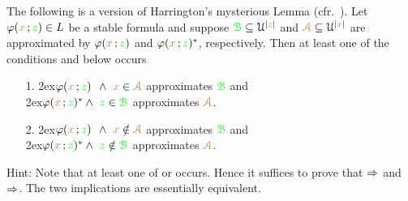 \documentclass[creche.tex]{subfiles}
\begin{document}
\begin{exercise}\label{ex_harrington}
\def\grB{{\gr{\EuScript B}}}
\def\mrA{{\mr{\EuScript A}}}
The following is a version of Harrington's mysterious 
Lemma (cfr.~\cite[Lemma 8.3.4]{TZ}).
Let $\varphi({\color{brown} x}\,;{\color{green} z})\in L$ be a stable formula and suppose $\grB\subseteq\U^{|{\gr z}|}$ and $\mrA\subseteq\U^{|{\mr x}|}$ are approximated by $\varphi({\color{brown} x}\,;{\color{green} z})$ and  $\varphi({\color{brown} x}\,;{\color{green} z})^*$, respectively.
Then at least one of the conditions  and  below occurs

\begin{itemize}
\item[1.]
\kern2ex$\phi({\mr x}\,;{\gr z})^{\phantom{*}}\wedge\ {\mr x}\in{\mrA}$ approximates $\grB$ and\\
\kern2ex$\phi({\mr x}\,;{\gr z})^*\wedge\ {\gr z}\in{\grB}$ approximates $\mrA$.

\item[2.]
\kern2ex$\phi({\mr x}\,;{\gr z})^{\phantom{*}}\wedge\ {\mr x}\notin{\mrA}$ approximates $\grB$ and\\
\kern2ex$\phi({\mr x}\,;{\gr z})^*\wedge\ {\gr z}\notin{\grB}$ approximates $\mrA$.

\end{itemize}
Hint: Note that at least one of  or  occurs.
Hence it suffices to prove that $\Rightarrow$ and $\Rightarrow$. The two implications are essentially equivalent.
% 
% 
% 
% 
% 
% 
% 
% 
% 
% 
\end{exercise}
\end{document}

